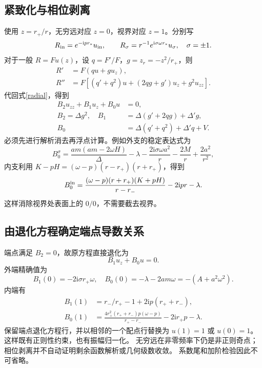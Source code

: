 \documentclass[UTF8,fontset=fandol,11pt,a4paper]{ctexart}
\newcommand{\ii}{\mathrm{i}}
\numberwithin{equation}{section}
\begin{document}
\subsection{紧致化与相位剥离}
使用 $z=r_+/r$，无穷远对应 $z=0$，视界对应 $z=1$。分别写
\begin{equation}
R_{\rm in}=e^{-\ii p r_*}u_{\rm in},\qquad
R_\sigma=r^{-1}e^{\ii\sigma\omega r_*}u_\sigma,\quad\sigma=\pm1.
\end{equation}
对于一般 $R=Fu(z)$，设 $q=F'/F$，$g=z_r=-z^2/r_+$，则
\begin{align}
R'&=F(qu+gu_z),\\
R''&=F[(q'+q^2)u+(2qg+g')u_z+g^2u_{zz}].
\end{align}
代回式\eqref{radial}，得到
\begin{align}
B_2u_{zz}+B_1u_z+B_0u&=0,\\
B_2=\Delta g^2,\quad B_1&=\Delta(g'+2qg)+\Delta'g,\\
B_0&=\Delta(q'+q^2)+\Delta'q+V.
\end{align}
必须先进行解析消去再浮点计算。例如外支的稳定表达式为
\begin{equation}
B_0^\sigma=\frac{am(am-2\omega H)}\Delta-\lambda
-\frac{2\ii\sigma\omega a^2}r-\frac{2M}r+\frac{2a^2}{r^2},
\end{equation}
内支利用 $K-pH=(\omega-p)(r-r_+)(r+r_+)$，得到
\begin{equation}
B_0^{\rm in}=\frac{(\omega-p)(r+r_+)(K+pH)}{r-r_-}-2\ii pr-\lambda.
\end{equation}
这样消除视界处表面上的 $0/0$，不需要截去视界。

\subsection{由退化方程确定端点导数关系}
端点满足 $B_2=0$，故原方程直接退化为
\begin{equation}B_1u_z+B_0u=0.\end{equation}
外端精确值为
\begin{equation}
B_1(0)=-2\ii\sigma r_+\omega,\quad
B_0(0)=-\lambda-2am\omega=-(A+a^2\omega^2).
\end{equation}
内端有
\begin{align}
B_1(1)&=r_-/r_+-1+2\ii p(r_++r_-),\\
B_0(1)&=\frac{4r_+^2(r_++r_-)p(\omega-p)}{r_+-r_-}-2\ii r_+p-\lambda.
\end{align}
保留端点退化方程行，并以相邻的一个配点行替换为 $u(1)=1$ 或 $u(0)=1$。
这样既有正则性约束，也有振幅归一化。
无穷远在非零频率下仍是非正则奇点；相位剥离并不自动证明剩余函数解析或几何级数收敛。
系数尾和加阶检验因此不可省略。
\end{document}
